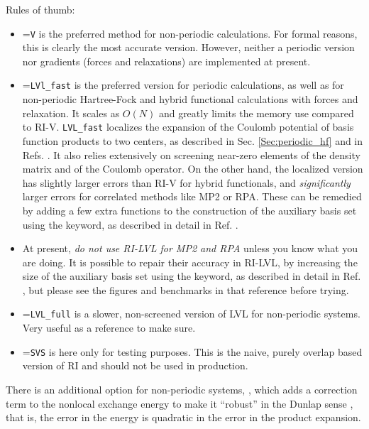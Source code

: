 Rules of thumb:
\begin{itemize}
  \item {}=\texttt{V} is the preferred method for
    non-periodic calculations. For formal reasons, this is clearly the
    most accurate version. However, neither a periodic version nor
    gradients (forces and relaxations) are implemented at present.
  \item {}=\texttt{LVl\_fast} is the preferred version for
    periodic calculations, as well as for non-periodic Hartree-Fock and
    hybrid functional calculations with
    forces and relaxation. It scales as $O(N)$ and greatly limits
    the memory use compared to RI-V. 
    \texttt{LVL\_fast} localizes the expansion of the Coulomb
    potential of basis function products to two centers, as described
    in Sec. \ref{Sec:periodic_hf} and in
    Refs. \cite{Ihrig2015,Levchenko2015}. It also relies extensively
    on screening near-zero elements of the density matrix and of the
    Coulomb operator. On the other hand, the localized
    version has slightly larger errors than RI-V for hybrid
    functionals, and \emph{significantly} larger errors for correlated
    methods like MP2 or RPA. These can be remedied by adding a few
    extra functions to the construction of the auxiliary basis set
    using the  keyword, as described in detail in
    Ref. \cite{Ihrig2015}.
  \item At present, \emph{do not use RI-LVL for MP2 and RPA} unless
    you know what you are doing. It is possible to repair their
    accuracy in RI-LVL, by increasing the size of the auxiliary basis
    set using the  keyword, as described in detail in
    Ref. \cite{Ihrig2015}, but please see the figures and benchmarks
    in that reference before trying.
  \item {}=\texttt{LVL\_full} is a slower, non-screened version
    of LVL for non-periodic systems. Very useful as a reference to
    make sure.
  \item {}=\texttt{SVS} is here only for testing
    purposes. This is the naive, purely overlap based version of RI
    and should not be used in production.
\end{itemize}

There is an additional option for non-periodic systems,
, which adds a correction term to the nonlocal
exchange energy to make it ``robust'' in the Dunlap sense 
\cite{Dunlap10-RIreview}, that is, the error in the energy is quadratic in
the error in the product expansion.

